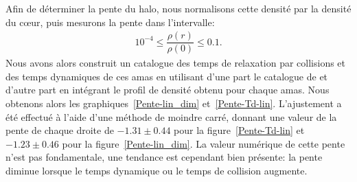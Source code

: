 

				Afin de déterminer la pente du halo, nous
				normalisons cette densité par la densité du cœur, puis mesurons la
				pente dans l'intervalle: %
				\begin{align*}
					10^{-4} \leq \dfrac{\rho(r)}{\rho(0)} \leq 0.1.
				\end{align*}
				Nous avons alors construit un catalogue des temps de relaxation par
				collisions et des temps dynamiques de ces amas en utilisant d'une part le catalogue de
				\cite{Harris} et d'autre part en intégrant le profil de densité obtenu
				pour chaque amas.
				Nous obtenons alors les graphiques~\ref{Pente-lin_dim} et~\ref{Pente-Td-lin}. L'ajustement a été effectué à l'aide
				d'une méthode de moindre carré, donnant une valeur de la pente de chaque droite de $-1.31\pm0.44$ pour la
				figure~\ref{Pente-Td-lin} et $-1.23\pm0.46$ pour la figure~\ref{Pente-lin_dim}. La valeur numérique de cette pente
				n'est pas fondamentale, une tendance est cependant bien présente: la pente diminue lorsque le temps dynamique ou le
				temps de collision augmente.

